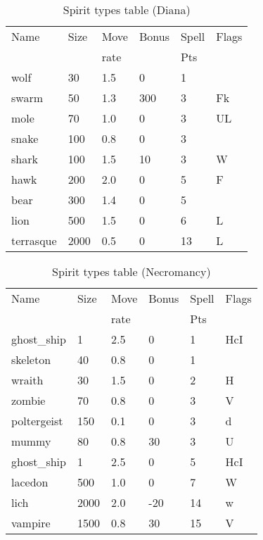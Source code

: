 \begin{same}
\begin{table}[hbpt]
\caption{Spirit types table (Diana)}
\begin{center}
\begin{tabular}{ || l | l | l | l | l | l || }
\hline
Name            & Size & Move & Bonus &Spell&Flags\\
                &      & rate &       &Pts  &\\
\hline
wolf            &   30 & 1.5 &   0 &  1 &\\
swarm           &   50 & 1.3 & 300 &  3 &Fk\\
mole            &   70 & 1.0 &   0 &  3 &UL\\
snake           &  100 & 0.8 &   0 &  3 &\\
shark           &  100 & 1.5 &  10 &  3 &W\\
hawk            &  200 & 2.0 &   0 &  5 &F\\
bear            &  300 & 1.4 &   0 &  5 &\\
lion            &  500 & 1.5 &   0 &  6 &L\\
terrasque       & 2000 & 0.5 &   0 & 13 &L\\
\hline
\end{tabular}
\end{center}
\end{table}
\end{same}
\begin{same}
\begin{table}[hbpt]
\caption{Spirit types table (Necromancy)}
\begin{center}
\begin{tabular}{ || l | l | l | l | l | l || }
\hline
Name            & Size & Move & Bonus &Spell&Flags\\
                &      & rate &       &Pts  &\\
\hline
ghost_ship      &    1 & 2.5 &   0 &  1 &HcI\\
skeleton        &   40 & 0.8 &   0 &  1 &\\
wraith          &   30 & 1.5 &   0 &  2 &H\\
zombie          &   70 & 0.8 &   0 &  3 &V\\
poltergeist     &  150 & 0.1 &   0 &  3 &d\\
mummy           &   80 & 0.8 &  30 &  3 &U\\
ghost_ship      &    1 & 2.5 &   0 &  5 &HcI\\
lacedon         &  500 & 1.0 &   0 &  7 &W\\
lich            & 2000 & 2.0 & -20 & 14 &w\\
vampire         & 1500 & 0.8 &  30 & 15 &V\\
\hline
\end{tabular}
\end{center}
\end{table}
\end{same}

